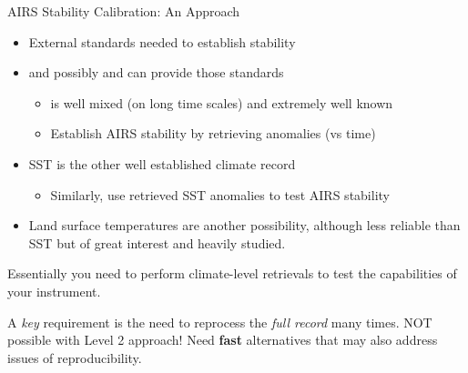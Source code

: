 \documentclass[10pt,t]{beamer}
\begin{document}
\begin{frame}[label={sec:org87bc820}]{AIRS Stability Calibration: An Approach}
\begin{itemize}
\item External standards needed to establish stability
\item \cd and possibly \nitrous and \methane can provide those standards
\begin{itemize}
\item \cd is well mixed (on long time scales) and extremely well known
\item Establish AIRS stability by retrieving \cd anomalies (vs time)
\end{itemize}
\item SST is the other well established climate record
\begin{itemize}
\item Similarly, use retrieved SST anomalies to test AIRS stability
\end{itemize}
\item Land surface temperatures are another possibility, although less reliable than SST but of great interest and heavily studied.
\end{itemize}

Essentially you need to perform climate-level retrievals to test the capabilities of your instrument.  

A \emph{key} requirement is the need to reprocess the \emph{full record} many times.  NOT possible with Level 2 approach!  Need \textbf{fast} alternatives that may also address issues of reproducibility.
\end{frame}
\end{document}
